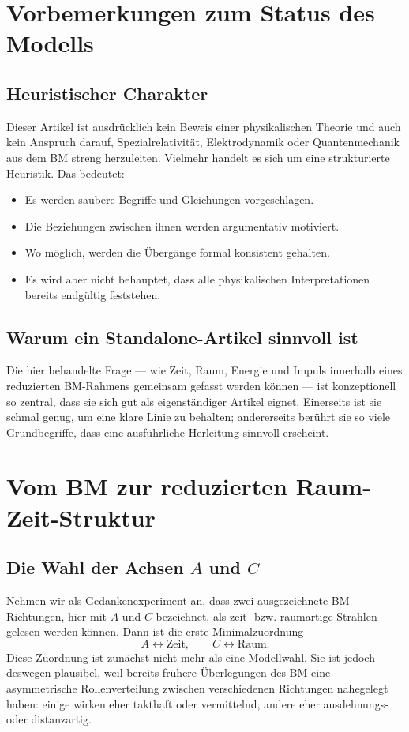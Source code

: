 \documentclass[11pt,a4paper]{article}
\theoremstyle{definition}
\theoremstyle{plain}
\begin{document}
	\section{Vorbemerkungen zum Status des Modells}
	
	\subsection{Heuristischer Charakter}
	
	Dieser Artikel ist ausdrücklich kein Beweis einer physikalischen Theorie und auch kein Anspruch darauf, Spezialrelativität, Elektrodynamik oder Quantenmechanik aus dem BM streng herzuleiten. Vielmehr handelt es sich um eine strukturierte Heuristik. Das bedeutet:
	\begin{itemize}[leftmargin=2em]
		\item Es werden saubere Begriffe und Gleichungen vorgeschlagen.
		\item Die Beziehungen zwischen ihnen werden argumentativ motiviert.
		\item Wo möglich, werden die Übergänge formal konsistent gehalten.
		\item Es wird aber nicht behauptet, dass alle physikalischen Interpretationen bereits endgültig feststehen.
	\end{itemize}
	
	\subsection{Warum ein Standalone-Artikel sinnvoll ist}
	
	Die hier behandelte Frage --- wie Zeit, Raum, Energie und Impuls innerhalb eines reduzierten BM-Rahmens gemeinsam gefasst werden können --- ist konzeptionell so zentral, dass sie sich gut als eigenständiger Artikel eignet. Einerseits ist sie schmal genug, um eine klare Linie zu behalten; andererseits berührt sie so viele Grundbegriffe, dass eine ausführliche Herleitung sinnvoll erscheint.
	
	\section{Vom BM zur reduzierten Raum-Zeit-Struktur}
	
	\subsection{Die Wahl der Achsen $A$ und $C$}
	
	Nehmen wir als Gedankenexperiment an, dass zwei ausgezeichnete BM-Richtungen, hier mit $A$ und $C$ bezeichnet, als zeit- bzw. raumartige Strahlen gelesen werden können. Dann ist die erste Minimalzuordnung
	\[
	A \leftrightarrow \text{Zeit},
	\qquad
	C \leftrightarrow \text{Raum}.
	\]
	Diese Zuordnung ist zunächst nicht mehr als eine Modellwahl. Sie ist jedoch deswegen plausibel, weil bereits frühere Überlegungen des BM eine asymmetrische Rollenverteilung zwischen verschiedenen Richtungen nahegelegt haben: einige wirken eher takthaft oder vermittelnd, andere eher ausdehnungs- oder distanzartig.
	
\end{document}
